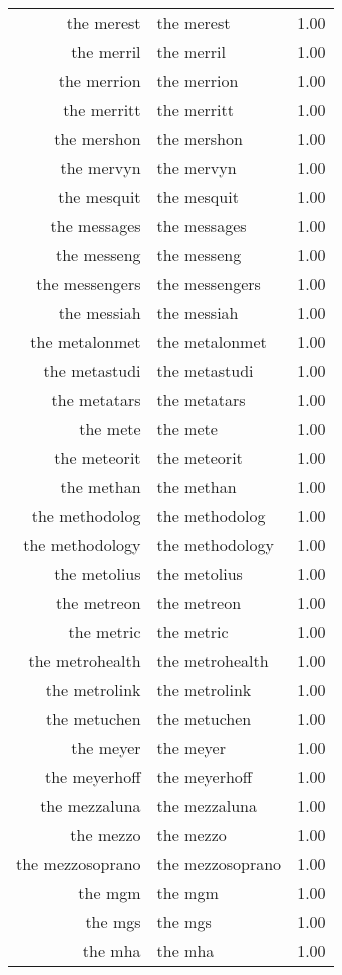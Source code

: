\begin{table}[ht]
\begin{tabular}{rlr}
  the merest & the merest & 1.00 \\ 
  the merril & the merril & 1.00 \\ 
  the merrion & the merrion & 1.00 \\ 
  the merritt & the merritt & 1.00 \\ 
  the mershon & the mershon & 1.00 \\ 
  the mervyn & the mervyn & 1.00 \\ 
  the mesquit & the mesquit & 1.00 \\ 
  the messages & the messages & 1.00 \\ 
  the messeng & the messeng & 1.00 \\ 
  the messengers & the messengers & 1.00 \\ 
  the messiah & the messiah & 1.00 \\ 
  the metalonmet & the metalonmet & 1.00 \\ 
  the metastudi & the metastudi & 1.00 \\ 
  the metatars & the metatars & 1.00 \\ 
  the mete & the mete & 1.00 \\ 
  the meteorit & the meteorit & 1.00 \\ 
  the methan & the methan & 1.00 \\ 
  the methodolog & the methodolog & 1.00 \\ 
  the methodology & the methodology & 1.00 \\ 
  the metolius & the metolius & 1.00 \\ 
  the metreon & the metreon & 1.00 \\ 
  the metric & the metric & 1.00 \\ 
  the metrohealth & the metrohealth & 1.00 \\ 
  the metrolink & the metrolink & 1.00 \\ 
  the metuchen & the metuchen & 1.00 \\ 
  the meyer & the meyer & 1.00 \\ 
  the meyerhoff & the meyerhoff & 1.00 \\ 
  the mezzaluna & the mezzaluna & 1.00 \\ 
  the mezzo & the mezzo & 1.00 \\ 
  the mezzosoprano & the mezzosoprano & 1.00 \\ 
  the mgm & the mgm & 1.00 \\ 
  the mgs & the mgs & 1.00 \\ 
  the mha & the mha & 1.00 \\ 

\end{tabular}
\end{table}

